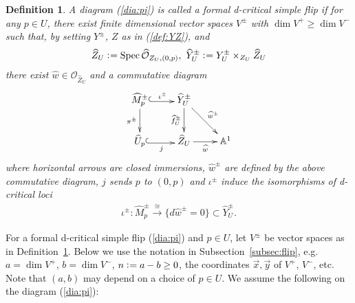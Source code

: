 \documentclass[11pt]{amsart}
\theoremstyle{plain}
\newtheorem{defi}[thm]{Definition}
\newcommand{\oO}{\mathcal{O}}
\newcommand{\Spec}{\mathop{\rm Spec}\nolimits}
\begin{document}
\begin{defi}\label{defi:dsflip}
A diagram (\ref{dia:pi}) is called 
a formal d-critical simple flip if 
for any $p \in U$, 
there exist 
finite dimensional vector spaces $V^{\pm}$ 
with $\dim V^+ \ge \dim V^-$ such that, 
by setting $Y^{\pm}$, $Z$ as in (\ref{def:YZ}), 
and 
\begin{align}\label{formal:YZ}
\widehat{Z}_U \cneq \Spec \widehat{\oO}_{Z_U, (0, p)}, \ 
\widehat{Y}^{\pm}_U \cneq 
Y_U^{\pm} \times_{Z_U} \widehat{Z}_U 
\end{align}
there exist
$\widehat{w} \in \oO_{\widehat{Z}_U}$ and 
a commutative diagram
\begin{align}\label{relchart2}
\xymatrix{
\widehat{M}_p^{\pm} \ar[d]_-{\pi^{\pm}}
 \ar@<-0.3ex>@{^{(}->}[r]^-{\iota^{\pm}} 
& \widehat{Y}_U^{\pm} \ar[d]_-{\widehat{f}_U^{\pm}} 
\ar[rd]^-{\widehat{w}^{\pm}} \\
\widehat{U}_p \ar@<-0.3ex>@{^{(}->}[r]_-{j} & \widehat{Z}_U
 \ar[r]_-{\widehat{w}} & \mathbb{A}^1
}
\end{align}
where horizontal arrows are closed immersions,
$\widehat{w}^{\pm}$ are defined by the above 
commutative diagram, 
$j$ sends $p$ to $(0, p)$ 
and $\iota^{\pm}$ induce the isomorphisms of 
d-critical loci
\begin{align}\label{isom:iota}
\iota^{\pm} \colon 
\widehat{M}_p^{\pm} \stackrel{\cong}{\to}
\{d\widehat{w}^{\pm}=0\} \subset \widehat{Y}_U^{\pm}.
 \end{align}
\end{defi}
For a formal d-critical simple flip (\ref{dia:pi})
and $p \in U$, let $V^{\pm}$ be vector spaces as in 
Definition~\ref{defi:dsflip}. 
Below 
we use the notation in Subsection~\ref{subsec:flip}, 
e.g. $a=\dim V^+$, $b=\dim V^-$, $n \cneq a-b \ge 0$, 
the
coordinates 
$\vec{x}, \vec{y}$ of $V^+$, $V^-$, etc. 
Note that $(a, b)$ may depend on a choice of $p \in U$. 
We assume the following on the diagram (\ref{dia:pi}):
\end{document}
